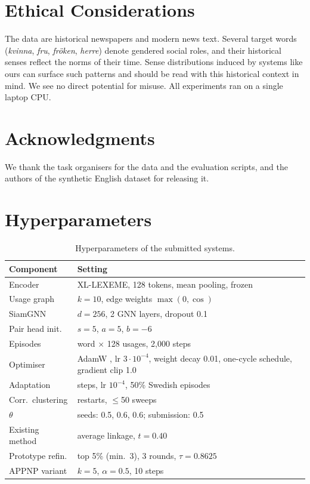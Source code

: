 \documentclass[11pt]{article}
\newcommand{\sys}{SiamGNN\xspace}
\newcommand{\xll}{XL-LEXEME\xspace}
\begin{document}
\section*{Ethical Considerations}
The data are historical newspapers and modern news text. Several target words (\emph{kvinna}, \emph{fru}, \emph{fröken}, \emph{herre}) denote gendered social roles, and their historical senses reflect the norms of their time. Sense distributions induced by systems like ours can surface such patterns and should be read with this historical context in mind. We see no direct potential for misuse. All experiments ran on a single laptop CPU.

\section*{Acknowledgments}
\acknowledgmentnote We thank the task organisers for the data and the evaluation scripts, and the authors of the synthetic English dataset for releasing it.



\appendix

\section{Hyperparameters}
\label{app:hparams}

\begin{table}[h]
\centering
\small
\begin{tabular}{@{}l>{\raggedright\arraybackslash}p{4.6cm}@{}}
\toprule
Component & Setting \\
\midrule
Encoder & \xll, 128 tokens, mean pooling, frozen \\
Usage graph & $k=10$, edge weights $\max(0,\cos)$ \\
\sys & $d=256$, 2 GNN layers, dropout 0.1 \\
Pair head init. & $s=5$, $a=5$, $b=-6$ \\
Episodes & 1 word $\times$ 128 usages, 2,000 steps \\
Optimiser & AdamW \citep{loshchilov2019decoupled}, lr $3{\cdot}10^{-4}$, weight decay 0.01, one-cycle schedule, gradient clip 1.0 \\
Adaptation & 300 steps, lr $10^{-4}$, 50\% Swedish episodes \\
Corr.\ clustering & 10 restarts, $\le$50 sweeps \\
$\theta$ & seeds: 0.5, 0.6, 0.6; submission: 0.5 \\
Existing method & average linkage, $t=0.40$ \\
Prototype refin. & top 5\% (min.\ 3), 3 rounds, $\tau=0.8625$ \\
APPNP variant & $k=5$, $\alpha=0.5$, 10 steps \\
\bottomrule
\end{tabular}
\caption{Hyperparameters of the submitted systems.}
\label{tab:hparams}
\end{table}
\end{document}
